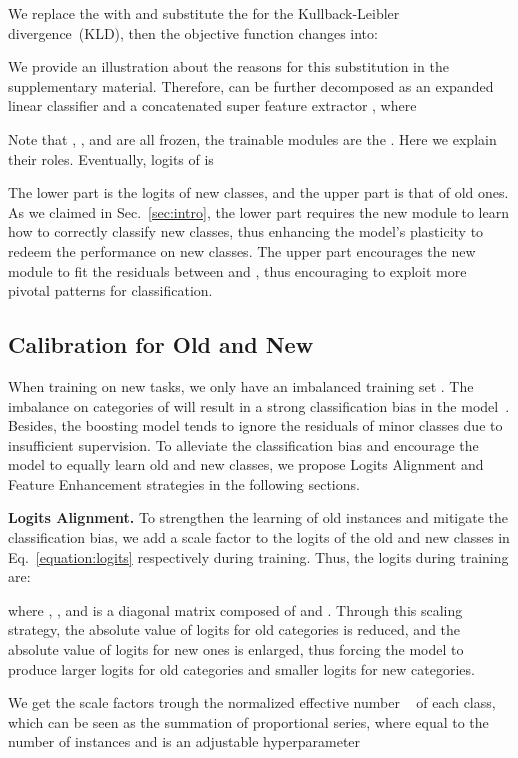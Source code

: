 \documentclass[runningheads]{llncs}
\begin{document}
We replace the  with  and substitute the  for the Kullback-Leibler divergence~(KLD), then the objective function changes into:

We provide an illustration about the reasons for this substitution in the supplementary material. Therefore,   can be further decomposed as an expanded linear classifier  and a concatenated super feature extractor , where

Note that , , and  are all frozen, the trainable modules are the . Here we explain their roles. Eventually, logits of  is 

The lower part is the logits of new classes, and the upper part is that of old ones. As we claimed in Sec.~\ref{sec:intro}, the lower part requires the new module   to learn how to correctly classify new classes, thus enhancing the model's plasticity to redeem the performance on new classes. The upper part encourages the new module to fit the residuals between  and , thus encouraging  to exploit more pivotal patterns for classification.

\subsection{Calibration for Old and New}\label{sec:calibration}
When training on new tasks, we only have an imbalanced training set . The imbalance on categories of  will result in a strong classification bias in the model~\cite{Decouple,WA,bic,EEIL}. Besides, the boosting model tends to ignore the residuals of minor classes due to insufficient supervision. To alleviate the classification bias and encourage the model to equally learn old and new classes, we propose Logits Alignment and Feature Enhancement strategies in the following sections.

\noindent\textbf{Logits Alignment.}\label{sec:LA}
To strengthen the learning of old instances and mitigate the classification bias, we add a scale factor to the logits of the old and new classes in Eq.~\ref{equation:logits} respectively during training.  Thus, the logits during training are:

where , , and  is a diagonal matrix composed of  and . Through this scaling strategy, the absolute value of logits for old categories is reduced, and the absolute value of logits for new ones is enlarged, thus forcing the model  to produce larger logits for old categories and smaller logits for new categories. 

We get the scale factors  trough the normalized effective number ~\cite{CBCE} of each class, which can be seen as the summation of proportional series, where  equal to the number of instances and  is an adjustable hyperparameter
\end{document}
